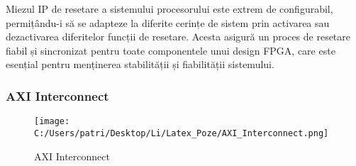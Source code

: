 \documentclass[12pt]{article}
\begin{document}
\hspace*{1cm}Miezul IP de resetare a sistemului procesorului este extrem de configurabil, permițându-i să se adapteze la diferite cerințe de sistem prin activarea sau dezactivarea diferitelor funcții de resetare. Acesta asigură un proces de resetare fiabil și sincronizat pentru toate componentele unui design FPGA, care este esențial pentru menținerea stabilității și fiabilității sistemului.



\subsubsection{AXI Interconnect} 

\begin{figure}[H]
    \centering
    \texttt{[image: C:/Users/patri/Desktop/Li/Latex\_Poze/AXI\_Interconnect.png]}
    \caption{AXI Interconnect}
\end{figure}
\end{document}
